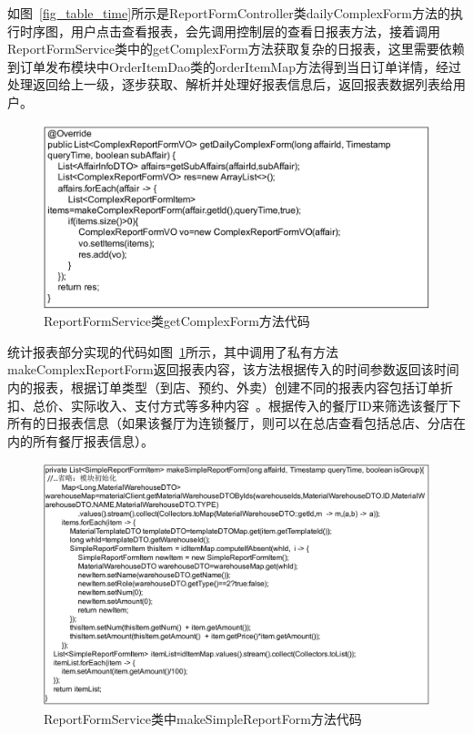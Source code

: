 如图~\ref{fig_table_time}所示是ReportFormController类dailyComplexForm方法的执行时序图，用户点击查看报表，会先调用控制层的查看日报表方法，接着调用ReportFormService类中的getComplexForm方法获取复杂的日报表，这里需要依赖到订单发布模块中OrderItemDao类的orderItemMap方法得到当日订单详情，经过处理返回给上一级，逐步获取、解析并处理好报表信息后，返回报表数据列表给用户。

\begin{figure}[htbp!]
    \centering
    \includegraphics[width=5in]{FIGs/chapter4/6.pdf}
    \caption{ReportFormService类getComplexForm方法代码}\label{fig_table_6}
\end{figure}

统计报表部分实现的代码如图~\ref{fig_table_6}所示，其中调用了私有方法makeComplexReportForm返回报表内容，该方法根据传入的时间参数返回该时间内的报表，根据订单类型（到店、预约、外卖）创建不同的报表内容包括订单折扣、总价、实际收入、支付方式等多种内容~\cite{lz2019}。根据传入的餐厅ID来筛选该餐厅下所有的日报表信息（如果该餐厅为连锁餐厅，则可以在总店查看包括总店、分店在内的所有餐厅报表信息）。

\begin{figure}[htbp!]
    \centering
    \includegraphics[width=\linewidth]{FIGs/chapter4/7.pdf}
    \caption{ReportFormService类中makeSimpleReportForm方法代码}\label{fig_table_7}
\end{figure}

